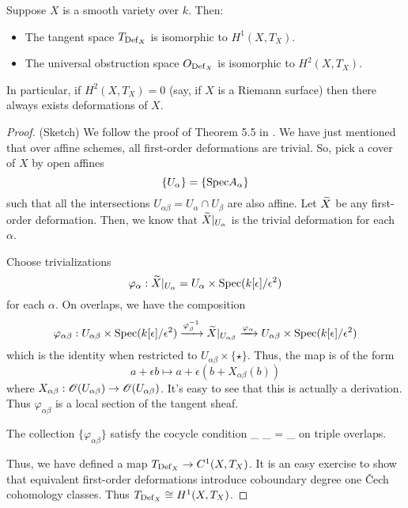 \documentclass[11pt]{amsart}
\def\Spec{{\rm Spec}}
\begin{document}
\begin{thm}
Suppose $X$ is a smooth variety over $k$. 
Then:
\begin{itemize}
\item The tangent space $T_{{\rm Def}_X}$ is isomorphic to $H^1(X, T_X)$. 
\item The universal obstruction space $O_{{\rm Def}_X}$ is isomorphic to $H^2(X, T_X)$. 
\end{itemize}
In particular, if $H^2(X, T_X) = 0$ (say, if $X$ is a Riemann surface) then there always exists deformations of $X$. 
\end{thm}

\begin{proof} 
(Sketch)
We follow the proof of Theorem 5.5 in \cite{Hartshorne}. 
We have just mentioned that over affine schemes, all first-order deformations are trivial. 
So, pick a cover of $X$ by open affines
\[
\{U_\alpha\} = \{\Spec A_\alpha\}
\] 
such that all the intersections $U_{\alpha\beta} = U_{\alpha} \cap U_\beta$ are also affine. 
Let $\Tilde{X}$ be any first-order deformation.
Then, we know that $\Tilde{X}|_{U_\alpha}$ is the trivial deformation for each $\alpha$. 

Choose trivializations
\[
\varphi_\alpha : \Tilde{X}|_{U_\alpha} = U_\alpha \times \Spec(k[\epsilon]/\epsilon^2)
\]
for each $\alpha$.
On overlaps, we have the composition
\[
\varphi_{\alpha \beta} :  U_{\alpha\beta} \times \Spec(k[\epsilon]/\epsilon^2) \xto{\varphi_{\beta}^{-1}} \Tilde{X}|_{U_{\alpha\beta}} \xto{\varphi_\alpha} U_{\alpha\beta} \times \Spec(k[\epsilon]/\epsilon^2) 
\]
which is the identity when restricted to $U_{\alpha\beta} \times \{\star\}$.
Thus, the map is of the form
\[
a + \epsilon b \mapsto a + \epsilon(b + X_{\alpha\beta} (b))
\]
where $X_{\alpha \beta} : \sO(U_{\alpha\beta}) \to \sO(U_{\alpha\beta})$. 
It's easy to see that this is actually a derivation. 
Thus $\varphi_{\alpha\beta}$ is a local section of the tangent sheaf. 

The collection $\{\varphi_{\alpha \beta}\}$ satisfy the cocycle condition
\beqn\label{cocycle}
\varphi_{\alpha\beta} \circ \varphi_{\beta \gamma} = \varphi_{\alpha \gamma}
\eeqn
on triple overlaps. 

Thus, we have defined a map $T_{\Def_X} \to {C}^1(X, T_X)$. 
It is an easy exercise to show that equivalent first-order deformations introduce coboundary degree one \v{C}ech cohomology classes. 
Thus $T_{\Def_X} \cong H^1(X, T_X)$. 


\end{proof}
\end{document}
